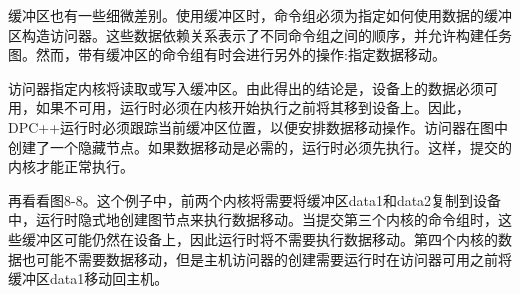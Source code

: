 缓冲区也有一些细微差别。使用缓冲区时，命令组必须为指定如何使用数据的缓冲区构造访问器。这些数据依赖关系表示了不同命令组之间的顺序，并允许构建任务图。然而，带有缓冲区的命令组有时会进行另外的操作:指定数据移动。\par

访问器指定内核将读取或写入缓冲区。由此得出的结论是，设备上的数据必须可用，如果不可用，运行时必须在内核开始执行之前将其移到设备上。因此，DPC++运行时必须跟踪当前缓冲区位置，以便安排数据移动操作。访问器在图中创建了一个隐藏节点。如果数据移动是必需的，运行时必须先执行。这样，提交的内核才能正常执行。\par

再看看图8-8。这个例子中，前两个内核将需要将缓冲区data1和data2复制到设备中，运行时隐式地创建图节点来执行数据移动。当提交第三个内核的命令组时，这些缓冲区可能仍然在设备上，因此运行时将不需要执行数据移动。第四个内核的数据也可能不需要数据移动，但是主机访问器的创建需要运行时在访问器可用之前将缓冲区data1移动回主机。\par



























































